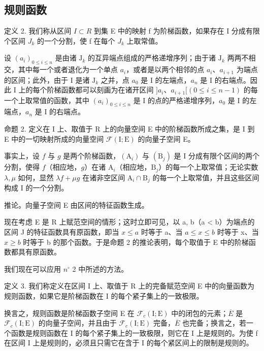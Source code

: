 \subsection{规则函数}

定义 2. 我们称从区间 \(I \subset R\) 到集 E 中的映射 f 为阶梯函数，如果存在 I 分成有限个区间 \(J_{k}\) 的一个分割，使 f 在每个 \(J_{k}\) 上取常值。

设 \((a_{i})_{0\leqslant i\leqslant n}\) 是由诸 \(\mathrm{J}_k\) 的互异端点组成的严格递增序列；由于诸 \(\mathrm{J}_k\) 两两不相交，其中每一个或者退化为一个单点 \(a_{i}\)，或者是以两个相邻的点 \(a_{i}\)、\(a_{i + 1}\) 为端点的区间；此外，由于 I 是诸 \(\mathrm{J}_k\) 之并，点 \(a_0\) 是 I 的左端点，\(a_{n}\) 是 I 的右端点。因此 I 上的每个阶梯函数都可以刻画为在诸开区间 \(]a_{i}\)、\(a_{i+1}[ (0 \leqslant i \leqslant n-1)\) 的每一个上取常值的函数，其中 \((a_{i})_{0 \leqslant i \leqslant n}\) 是 I 的点的严格递增序列，\(a_{0}\) 是 I 的左端点，\(a_{n}\) 是 I 的右端点。

命题 2. 定义在 I 上、取值于 R 上的向量空间 E 中的阶梯函数所成之集，是 I 到 E 中的一切映射所成的向量空间 \(\mathcal{F}(\mathrm{I};\mathrm{E})\) 的向量子空间 E。

事实上，设 \(f\) 与 \(g\) 是两个阶梯函数，\((\mathrm{A}_i)\) 与 \((\mathrm{B}_j)\) 是 I 分成有限个区间的两个分割，使得 \(f\)（相应地，\(g\)）在诸 \(\mathrm{A}_i\)（相应地，\(\mathrm{B}_j\)）的每一个上取常值；无论实数 \(\lambda, \mu\) 如何，显然 \(\lambda f + \mu g\) 在诸非空区间 \(\mathrm{A}_i \cap \mathrm{B}_j\) 的每一个上取常值，并且这些区间构成 I 的一个分割。

推论。向量子空间 E 由区间的特征函数生成。

现在考虑 E 是 R 上赋范空间的情形；这时立即可见，以 a, b（a \textless{} b）为端点的区间 J 的特征函数具有原函数，即当 \(x \leqslant a\) 时等于 a、当 \(a \leqslant x \leqslant b\) 时等于 x、当 \(x \geqslant b\) 时等于 b 的那个函数。于是命题 2 的推论表明，每个取值于 E 中的阶梯函数都具有原函数。

我们现在可以应用 \(n^{\circ}\) 2 中所述的方法。

定义 3. 我们称定义在区间 I 上、取值于 R 上的完备赋范空间 E 中的向量函数为规则函数，如果它是阶梯函数在 I 的每个紧子集上的一致极限。

换言之，规则函数是阶梯函数子空间 E 在 \(\mathcal{F}_{c}(\mathrm{I};\mathrm{E})\) 中的闭包的元素；\(\overline{E}\) 是 \(\mathcal{F}_{c}(\mathrm{I};\mathrm{E})\) 的向量子空间，并且由于 \(\mathcal{F}_{c}(\mathrm{I};\mathrm{E})\) 完备，\(\overline{E}\) 也完备；换言之，若一个函数是规则函数在 I 的每个紧子集上的一致极限，则它在 I 上是规则的。为使 f 在区间 I 上是规则的，必须且只需它在含于 I 的每个紧区间上的限制是规则的。

